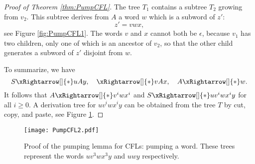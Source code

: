\begin{proof}[Proof of Theorem \ref{thm:PumpCFL}]
The tree $T_1$ contains a subtree $T_2$ growing from $v_2$.
This subtree derives from $A$ a word $w$ which is a subword of $z'$:
\[
z' = vwx,
\]
see Figure \ref{fig:PumpCFL1}.
The words $v$ and $x$ cannot both be $\epsilon$, because $v_1$ has two children, only one of which is an ancestor of $v_2$,
so that the other child generates a subword of $z'$ disjoint from $w$.

To summarize, we have
\[
S \xRightarrow[]{*} uAy, \quad \xRightarrow[]{*} vAx, \quad A \xRightarrow[]{*} w.
\]
It follows that $A \xRightarrow[]{*} v^iwx^i$ and $S \xRightarrow[]{*} uv^iwx^iy$ for all $i \ge 0$.
A derivation tree for $uv^iwx^iy$ can be obtained from the tree $T$ by cut, copy, and paste, see Figure \ref{fig:PumpCFL2}.
\end{proof}

\begin{figure}[ht]
\begin{center}
\texttt{[image: PumpCFL2.pdf]}
\end{center}
\caption{Proof of the pumping lemma for CFLs: pumping a word. These trees represent the words $uv^3wx^3y$ and $uwy$ respectively.}
\label{fig:PumpCFL2}
\end{figure}




